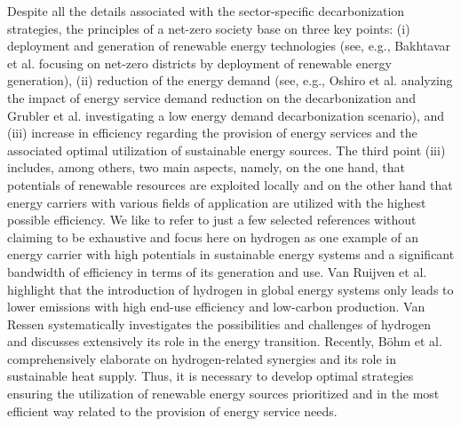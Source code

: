 Despite all the details associated with the sector-specific decarbonization strategies, the principles of a net-zero society base on three key points: (i) deployment and generation of renewable energy technologies (see, e.g., Bakhtavar et al. \cite{bakhtavar2020assessment} focusing on net-zero districts by deployment of renewable energy generation), (ii) reduction of the energy demand (see, e.g., Oshiro et al. \cite{oshiro2021enabling} analyzing the impact of energy service demand reduction on the decarbonization and Grubler et al. \cite{grubler2018low} investigating a low energy demand decarbonization scenario), and (iii) increase in efficiency regarding the provision of energy services and the associated optimal utilization of sustainable energy sources. The third point (iii) includes, among others, two main aspects, namely, on the one hand, that potentials of renewable resources are exploited locally and on the other hand that energy carriers with various fields of application are utilized with the highest possible efficiency. We like to refer to just a few selected references without claiming to be exhaustive and focus here on hydrogen as one example of an energy carrier with high potentials in sustainable energy systems and a significant bandwidth of efficiency in terms of its generation and use. Van Ruijven et al. \cite{van2007potential} highlight that the introduction of hydrogen in global energy systems only leads to lower emissions with high end-use efficiency and low-carbon production. Van Ressen \cite{van2020hydrogen} systematically investigates the possibilities and challenges of hydrogen and discusses extensively its role in the energy transition. Recently, Böhm et al. \cite{bohm2021power} comprehensively elaborate on hydrogen-related synergies and its role in sustainable heat supply. Thus, it is necessary to develop optimal strategies ensuring the utilization of renewable energy sources prioritized and in the most efficient way related to the provision of energy service needs.\vspace{0.3cm}

